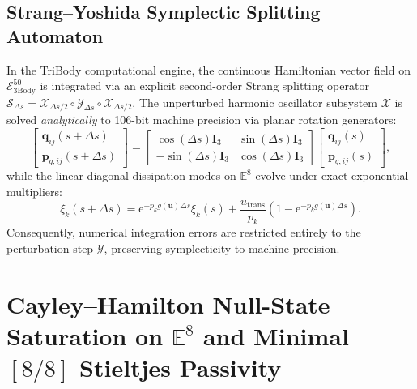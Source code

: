 \documentclass[11pt,a4paper,reqno]{article}
\theoremstyle{plain}
\theoremstyle{definition}
\theoremstyle{remark}
\numberwithin{equation}{section}
\newcommand{\Ebody}{\mathcal{E}^{50}_{\mathrm{3Body}}}
\begin{document}
\subsection{Strang--Yoshida Symplectic Splitting Automaton}
\label{subsec:strang_yoshida_splitting}
In the TriBody computational engine, the continuous Hamiltonian vector field on $\Ebody$ is integrated via an explicit second-order Strang splitting operator $\mathcal{S}_{\Delta s} = \mathcal{X}_{\Delta s/2} \circ \mathcal{Y}_{\Delta s} \circ \mathcal{X}_{\Delta s/2}$.
The unperturbed harmonic oscillator subsystem $\mathcal{X}$ is solved \emph{analytically} to 106-bit machine precision via planar rotation generators:
\begin{equation}
  \begin{bmatrix} \mathbf{q}_{ij}(s + \Delta s) \\ \mathbf{p}_{q,ij}(s + \Delta s) \end{bmatrix} = \begin{bmatrix} \cos(\Delta s)\mathbf{I}_3 & \sin(\Delta s)\mathbf{I}_3 \\ -\sin(\Delta s)\mathbf{I}_3 & \cos(\Delta s)\mathbf{I}_3 \end{bmatrix} \begin{bmatrix} \mathbf{q}_{ij}(s) \\ \mathbf{p}_{q,ij}(s) \end{bmatrix},
  \label{eq:harmonic_rotation_exact}
\end{equation}
while the linear diagonal dissipation modes on $\mathbb{E}^8$ evolve under exact exponential multipliers:
\begin{equation}
  \xi_k(s + \Delta s) = \mathrm{e}^{-p_k g(\mathbf{u})\Delta s} \xi_k(s) + \frac{u_{\mathrm{trans}}}{p_k}\left(1 - \mathrm{e}^{-p_k g(\mathbf{u})\Delta s}\right).
  \label{eq:exponential_stepper_exact}
\end{equation}
Consequently, numerical integration errors are restricted entirely to the perturbation step $\mathcal{Y}$, preserving symplecticity to machine precision.

\section{Cayley--Hamilton Null-State Saturation on \texorpdfstring{$\mathbb{E}^8$}{E\textasciicircum 8} and Minimal \texorpdfstring{$[8/8]$}{[8/8]} Stieltjes Passivity}
\label{sec:stieltjes_passivity_e8}
\end{document}
